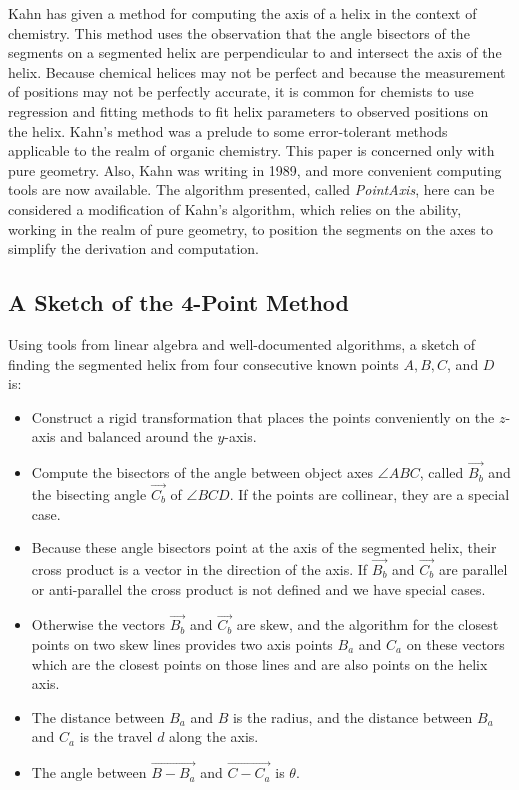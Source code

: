 \documentclass[11pt]{article}
\begin{document}
{Kahn\cite{kahn1989defining} has given a method for computing
the axis of a helix in the context of chemistry.
This method uses the observation that the angle bisectors
of the segments on a segmented helix are perpendicular to
and intersect the axis of the helix.
Because chemical helices may not be perfect and because the measurement of positions may not be perfectly accurate,
it is common for chemists to use regression and fitting methods to fit helix parameters to observed positions
on the helix.
Kahn's method was a prelude to some error-tolerant methods applicable to
the realm of organic chemistry\cite{enkhbayar2008helfit}.
This paper is concerned only with pure geometry. Also, Kahn was writing in 1989,
and more convenient computing tools are now available.
The algorithm presented, called {\em PointAxis}, here can be considered a modification of Kahn's algorithm,
which relies on the ability, working in the realm of pure geometry, to position the segments on the axes
to simplify the derivation and computation.

\subsection{A Sketch of the 4-Point Method}

Using tools from linear algebra and well-documented algorithms, a sketch of finding the segmented helix from
four consecutive known points $A,B,C$, and $D$ is:
\begin{itemize}
\item Construct a rigid transformation that places the points conveniently on the $z$-axis and balanced
  around the $y$-axis.
\item Compute the bisectors of the angle between object axes $ \angle{ABC}$, called $\overrightarrow{B_b}$ and the
  bisecting angle $\overrightarrow{C_b}$ of $\angle{BCD}$.
  If the points are collinear, they are a special case.
\item Because these angle bisectors point at the axis of the segmented helix, their cross product is a vector
  in the direction of the axis. If $\overrightarrow{B_b}$ and $\overrightarrow{C_b}$ are parallel or anti-parallel the cross product is not defined
  and we have special cases.
\item  Otherwise the vectors $\overrightarrow{B_b}$ and $\overrightarrow{C_b}$ are skew, and the algorithm for the closest points on
  two skew lines provides two axis points $B_a$ and $C_a$ on these vectors which
  are the closest points on those lines and are also points on the helix axis.
\item The distance between $B_a$ and $B$ is the radius, and the distance between $B_a$ and $C_a$ is the travel $d$ along the axis.
  \item The angle between $\overrightarrow{B - B_a}$ and $\overrightarrow{C - C_a}$ is $\theta$.
\end{itemize}

}
\end{document}
